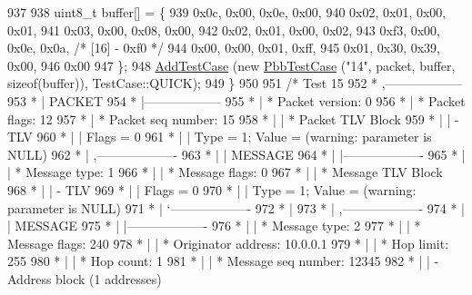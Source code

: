 \begin{DoxyCode}
937 
938     uint8\_t buffer[] = \{
939       0x0c, 0x00, 0x0e, 0x00,
940       0x02, 0x01, 0x00, 0x01,
941       0x03, 0x00, 0x08, 0x00,
942       0x02, 0x01, 0x00, 0x02,
943       0xf3, 0x00, 0x0e, 0x0a,  \textcolor{comment}{/* [16] - 0xf0 */}
944       0x00, 0x00, 0x01, 0xff,
945       0x01, 0x30, 0x39, 0x00,
946       0x00
947     \};
948     \hyperlink{classns3_1_1TestCase_a3718088e3eefd5d6454569d2e0ddd835}{AddTestCase} (\textcolor{keyword}{new} \hyperlink{classPbbTestCase}{PbbTestCase} (\textcolor{stringliteral}{"14"}, packet, buffer, \textcolor{keyword}{sizeof}(buffer)), 
      TestCase::QUICK);
949   \}
950 
951   \textcolor{comment}{/* Test 15}
952 \textcolor{comment}{         * ,------------------}
953 \textcolor{comment}{         * |  PACKET}
954 \textcolor{comment}{         * |------------------}
955 \textcolor{comment}{         * | * Packet version:    0}
956 \textcolor{comment}{         * | * Packet flags:  12}
957 \textcolor{comment}{         * | * Packet seq number: 15}
958 \textcolor{comment}{         * |    | * Packet TLV Block}
959 \textcolor{comment}{         * |    |     - TLV}
960 \textcolor{comment}{         * |    |         Flags = 0}
961 \textcolor{comment}{         * |    |         Type = 1; Value = (warning: parameter is NULL)}
962 \textcolor{comment}{         * |    ,-------------------}
963 \textcolor{comment}{         * |    |  MESSAGE}
964 \textcolor{comment}{         * |    |-------------------}
965 \textcolor{comment}{         * |    | * Message type:       1}
966 \textcolor{comment}{         * |    | * Message flags:  0}
967 \textcolor{comment}{         * |    | * Message TLV Block}
968 \textcolor{comment}{         * |    |     - TLV}
969 \textcolor{comment}{         * |    |         Flags = 0}
970 \textcolor{comment}{         * |    |         Type = 1; Value = (warning: parameter is NULL)}
971 \textcolor{comment}{         * |    `-------------------}
972 \textcolor{comment}{         * |}
973 \textcolor{comment}{         * |    ,-------------------}
974 \textcolor{comment}{         * |    |  MESSAGE}
975 \textcolor{comment}{         * |    |-------------------}
976 \textcolor{comment}{         * |    | * Message type:       2}
977 \textcolor{comment}{         * |    | * Message flags:  240}
978 \textcolor{comment}{         * |    | * Originator address: 10.0.0.1}
979 \textcolor{comment}{         * |    | * Hop limit:          255}
980 \textcolor{comment}{         * |    | * Hop count:          1}
981 \textcolor{comment}{         * |    | * Message seq number: 12345}
982 \textcolor{comment}{         * |    | - Address block (1 addresses)}

\end{DoxyCode}
